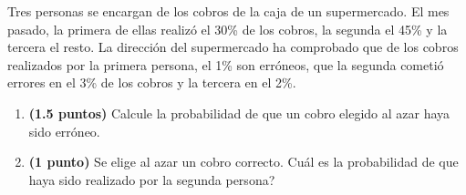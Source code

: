 
Tres personas se encargan de los cobros de la caja de un supermercado.
El mes pasado, la primera de ellas realizó el 30\% de los cobros, la segunda
el 45\% y la tercera el resto. La dirección del supermercado ha comprobado
que de los cobros realizados por la primera persona, el 1\% son erróneos,
que la segunda cometió errores en el 3\% de los cobros y la tercera en el 2\%.
\begin{enumerate}[label=\alph*)]
  \item \textbf{(1.5 puntos)} Calcule la probabilidad de que un cobro elegido
  al azar haya sido erróneo.
  \item \textbf{(1 punto)} Se elige al azar un cobro correcto.
  \textquestiondown{}Cuál es la probabilidad de que haya sido realizado por
  la segunda persona?
\end{enumerate}
